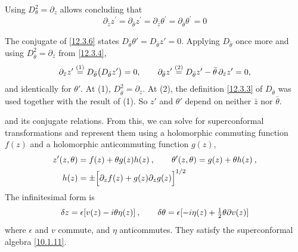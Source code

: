 \noindent Using $D_{\theta}^{2}=\partial_{z}$ allows concluding that
\begin{equation}
	\partial_{\bar{z}}z^{\prime}=\partial_{\bar{\theta}}z^{\prime}=\partial_{\bar{z}}\theta^{\prime}
	=\partial_{\bar{\theta}}\theta^{\prime} =0  \label{12.3.8}
\end{equation}
\begin{tcolorbox}[breakable]
	The conjugate of \eqref{12.3.6} states $D_{\bar\theta}\theta'=D_{\bar\theta}z'=0$. Applying $D_{\bar\theta}$ once more and using $D_{\bar\theta}^{2}=\partial_{\bar z}$ from \eqref{12.3.4},
	\begin{align*}
		\partial_{\bar z}z'\overset{(1)}{=} D_{\bar\theta}\bigl(D_{\bar\theta}z'\bigr)=0,\qquad
		\partial_{\bar\theta}z'\overset{(2)}{=} D_{\bar\theta}z'-\bar\theta\,\partial_{\bar z}z'=0 ,
	\end{align*}
	and identically for $\theta'$. At (1), $D_{\bar\theta}^{2}=\partial_{\bar z}$. At (2), the definition \eqref{12.3.3} of $D_{\bar\theta}$ was used together with the result of (1). So $z'$ and $\theta'$ depend on neither $\bar z$ nor $\bar\theta$.
\end{tcolorbox}
\noindent and its conjugate relations. From this, we can solve for superconformal transformations and represent them using a holomorphic commuting function $f(z)$ and a holomorphic anticommuting function $g(z)$,
\begin{subequations}
	\begin{align}
		z^{\prime}(z,\theta) &= f(z)+\theta g(z)h(z) \:, \qquad 
		\theta^{\prime}(z,\theta)=g(z)+\theta h(z) \:, \label{12.3.9a} \\
		h(z) &= \pm\Bigl[\partial_{z}f(z)+g(z)\partial_{z}g(z)\Bigr]^{1/2} \label{12.3.9b}
	\end{align} \label{12.3.9}
\end{subequations}
The infinitesimal form is
\begin{equation}
	\delta z= \epsilon[v(z)-i\theta\eta(z)] \:, \qquad 
	\delta \theta =\epsilon[-i\eta(z)+\tfrac{1}{2}\theta\partial v(z)]  \label{12.3.10}
\end{equation}
where $\epsilon$ and $v$ commute, and $\eta$ anticommutes. They satisfy the superconformal algebra \eqref{10.1.11}.
